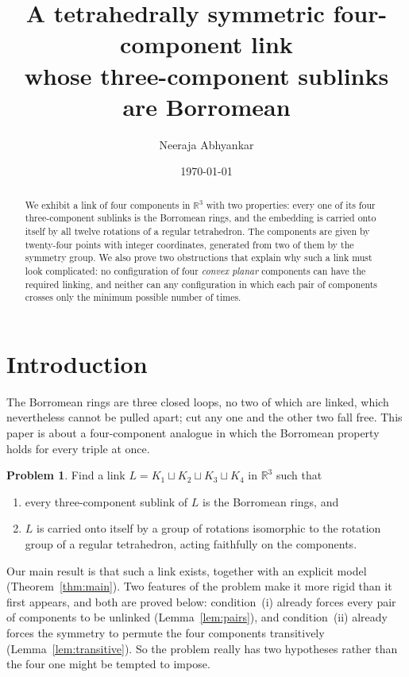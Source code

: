 \documentclass[11pt,a4paper]{article}
\title{\bfseries A tetrahedrally symmetric four-component link\\ whose three-component sublinks are Borromean}
\author{Neeraja Abhyankar}
\date{\today}
\theoremstyle{plain}
\theoremstyle{definition}
\newtheorem{problem}[theorem]{Problem}
\newcommand{\RR}{\mathbb{R}}
\begin{document}
\maketitle

\begin{abstract}
We exhibit a link of four components in $\RR^3$ with two properties: every one
of its four three-component sublinks is the Borromean rings, and the embedding
is carried onto itself by all twelve rotations of a regular tetrahedron. The
components are given by twenty-four points with integer coordinates, generated
from two of them by the symmetry group. We also prove two obstructions that
explain why such a link must look complicated: no configuration of four
\emph{convex planar} components can have the required linking, and neither can
any configuration in which each pair of components crosses only the minimum
possible number of times.
\end{abstract}

\section{Introduction}

The Borromean rings are three closed loops, no two of which are linked, which
nevertheless cannot be pulled apart; cut any one and the other two fall free.
This paper is about a four-component analogue in which the Borromean property
holds for every triple at once.

\begin{problem}\label{prob:main}
Find a link $L=K_1\sqcup K_2\sqcup K_3\sqcup K_4$ in $\RR^3$ such that
\begin{enumerate}
\item[(i)] every three-component sublink of $L$ is the Borromean rings, and
\item[(ii)] $L$ is carried onto itself by a group of rotations isomorphic to the
rotation group of a regular tetrahedron, acting faithfully on the components.
\end{enumerate}
\end{problem}

Our main result is that such a link exists, together with an explicit model
(Theorem~\ref{thm:main}). Two features of the problem make it more rigid than it
first appears, and both are proved below: condition~(i) already forces every
pair of components to be unlinked (Lemma~\ref{lem:pairs}), and condition~(ii)
already forces the symmetry to permute the four components transitively
(Lemma~\ref{lem:transitive}). So the problem really has two hypotheses rather
than the four one might be tempted to impose.
\end{document}
